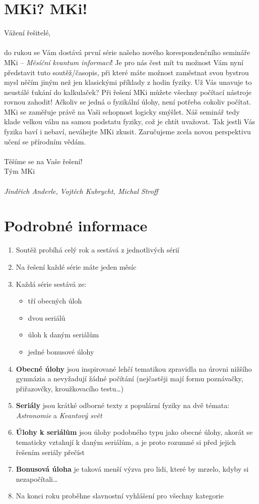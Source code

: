 \documentclass[12pt]{article}
\begin{document}
\section*{MKi? MKi!}
Vážení řešitelé,
\\\\
do rukou se Vám dostává první série našeho nového korespondenčního semináře MKi – \textit{Měsíční kvantum informací}!
Je pro nás čest mít tu možnost Vám nyní představit tuto soutěž/časopis,
při které máte možnost zaměstnat svou bystrou mysl něčím jiným než jen klasickými příklady z hodin fyziky.
Už Vás unavuje to neustálé ťukání do kalkulaček? Při řešení MKi můžete všechny počítací nástroje rovnou zahodit!
Ačkoliv se jedná o fyzikální úlohy, není potřeba cokoliv počítat.
MKi se zaměřuje právě na Vaši schopnost logicky smýšlet.
Náš seminář tedy klade velkou váhu na samou podstatu fyziky, což je chtít uvažovat. Tak jestli Vás fyzika baví i nebaví, neváhejte MKi zkusit.
Zaručujeme zcela novou perspektivu učení se přírodním vědám.
\\\\
Těšíme se na Vaše řešení!\\
Tým MKi
\\\\
\textit{Jindřich Anderle, Vojtěch Kubrycht, Michal Stroff}

\section*{Podrobné informace}

\begin{enumerate}
    \item Soutěž probíhá celý rok a sestává z jednotlivých sérií
    \item Na řešení každé série máte jeden měsíc
    \item Každá série sestává ze:
    \begin{itemize}
        \item tří obecných úloh
        \item dvou seriálů
        \item úloh k daným seriálům
        \item jedné bonusové úlohy
    \end{itemize}
    \item \textbf{Obecné úlohy} jsou inspirované lehčí tematikou zpravidla na úrovni nižšího gymnázia a nevyžadují žádné počítání (nejčastěji mají formu poznávačky, přiřazovčky, kroužkovacího testu\dots)
    \item \textbf{Seriály} jsou krátké odborné texty z populární fyziky na dvě témata: \textit{Astronomie} a \textit{Kvantový svět}
    \item \textbf{Úlohy k seriálům} jsou úlohy podobného typu jako obecné úlohy, akorát se tematicky vztahují k daným seriálům, a je proto rozumné si před jejich řešením seriály přečíst
    \item \textbf{Bonusová úloha} je taková menší výzva pro lidi, které by mrzelo, kdyby si nezapočítali\dots
    \item Na konci roku proběhne slavnostní vyhlášení pro všechny kategorie
    \end{enumerate}
\end{document}
